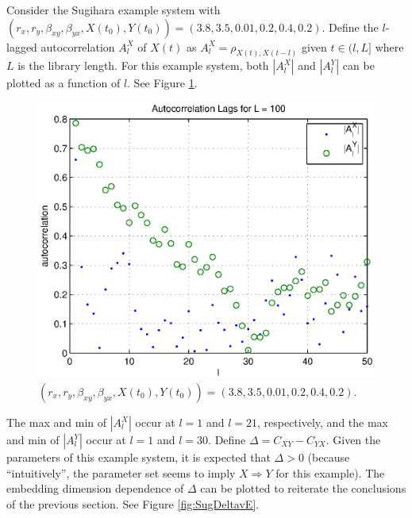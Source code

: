 \documentclass[a4paper,11pt]{article}
\begin{document}
Consider the Sugihara example system with $\left(r_x,r_y,\beta_{xy},\beta_{yx},X(t_0),Y(t_0)\right) = \left(3.8,3.5,0.01,0.2,0.4,0.2\right)$.  Define the $l$-lagged autocorrelation $A_l^X$ of $X(t)$ as $A_l^X=\rho_{X(t),X(t-l)}$ given $t\in(l,L]$ where $L$ is the library length.  For this example system, both $|A_l^X|$ and $|A_l^Y|$ can be plotted as a function of $l$.  See Figure \ref{fig:autocorrSug}.
\begin{figure}[h!t]
\centering
\label{fig:autocorrSug}
\includegraphics[scale=0.55]{autocorrSug.eps}
\caption{$\left(r_x,r_y,\beta_{xy},\beta_{yx},X(t_0),Y(t_0)\right) = \left(3.8,3.5,0.01,0.2,0.4,0.2\right)$.}
\end{figure}
The max and min of $|A_l^X|$ occur at $l=1$ and $l=21$, respectively, and the  max and min of $|A_l^Y|$ occur at $l=1$ and $l=30$.  Define $\Delta=C_{XY}-C_{YX}$.  Given the parameters of this example system, it is expected that $\Delta>0$ (because ``intuitively'', the parameter set seems to imply $X\Rightarrow Y$ for this example).  The embedding dimension dependence of $\Delta$ can be plotted to reiterate the conclusions of the previous section.  See Figure \ref{fig:SugDeltavE}.
\end{document}
